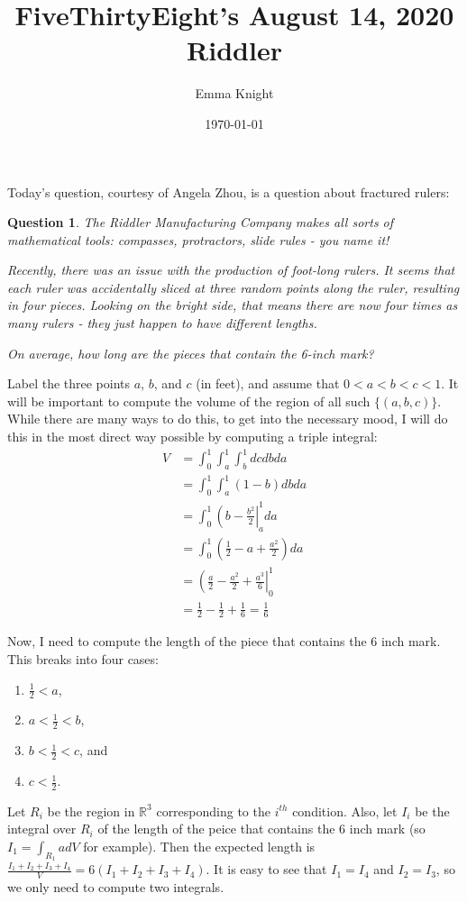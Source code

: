 \documentclass[11pt]{article}
\title{FiveThirtyEight's August 14, 2020 Riddler}
\author{Emma Knight}
\date{\today}
\newtheorem{question}[theorem]{Question}
\theoremstyle{definition}
\newcommand{\R}{\mathbb{R}}
\begin{document}
\maketitle

Today's question, courtesy of Angela Zhou, is a question about fractured rulers:
\begin{question}
The Riddler Manufacturing Company makes all sorts of mathematical tools: compasses, protractors, slide rules - you name it!

Recently, there was an issue with the production of foot-long rulers. It seems that each ruler was accidentally sliced at three random points along the ruler, resulting in four pieces. Looking on the bright side, that means there are now four times as many rulers - they just happen to have different lengths.

On average, how long are the pieces that contain the 6-inch mark?
\end{question}

Label the three points $a$, $b$, and $c$ (in feet), and assume that $0 < a < b < c < 1$.  It will be important to compute the volume of the region of all such $\{(a, b, c)\}$.  While there are many ways to do this, to get into the necessary mood, I will do this in the most direct way possible by computing a triple integral:
\begin{align*}
V & = \int_0^1 \int_a^1 \int_b^1 dcdbda \\
& = \int_0^1 \int_a^1 (1-b) dbda \\
& = \int_0^1 \left(b-\frac{b^2}{2}\right|_a^1 da \\
& = \int_0^1 \left(\frac{1}{2} - a + \frac{a^2}{2}\right) da \\
& = \left(\frac{a}{2} - \frac{a^2}{2} + \frac{a^3}{6}\right|_0^1 \\
& = \frac{1}{2} - \frac{1}{2} + \frac{1}{6} = \frac{1}{6}
\end{align*}

Now, I need to compute the length of the piece that contains the $6$ inch mark.  This breaks into four cases:
\begin{enumerate}
\item $\frac{1}{2} < a$, 
\item $a < \frac{1}{2} < b$, 
\item $b < \frac{1}{2} < c$, and
\item $c < \frac{1}{2}$.
\end{enumerate}
Let $R_i$ be the region in $\R^3$ corresponding to the $i^{th}$ condition.  Also, let $I_i$ be the integral over $R_i$ of the length of the peice that contains the $6$ inch mark (so $I_1 = \int_{R_1} adV$ for example).  Then the expected length is $\frac{I_1 + I_2 + I_3 + I_4}{V} = 6(I_1 + I_2 + I_3 + I_4)$.  It is easy to see that $I_1 = I_4$ and $I_2 = I_3$, so we only need to compute two integrals.
\end{document}
